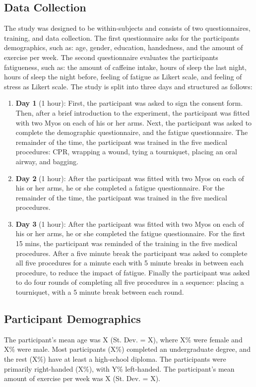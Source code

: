\subsection{Data Collection}
\label{sec:Experimental-Design:Data-Collection}
The study was designed to be within-subjects and consists of two questionnaires, training, and data collection. The first questionnaire asks for the participants demographics, such as: age, gender, education, handedness, and the amount of exercise per week. The second questionnaire evaluates the participants fatigueness, such as: the amount of caffeine intake, hours of sleep the last night, hours of sleep the night before, feeling of fatigue as Likert scale, and feeling of stress as Likert scale. The study is split into three days and structured as follows:
\begin{enumerate}
	\item \textbf{Day 1} (1 hour): First, the participant was asked to sign the consent form. Then, after a brief introduction to the experiment, the participant was fitted with two Myos on each of his or her arms. Next, the participant was asked to complete the demographic questionnaire, and the fatigue questionnaire. The remainder of the time, the participant was trained in the five medical procedures: CPR, wrapping a wound, tying a tourniquet, placing an oral airway, and bagging.
	\item \textbf{Day 2} (1 hour): After the participant was fitted with two Myos on each of his or her arms, he or she completed a fatigue questionnaire. For the remainder of the time, the participant was trained in the five medical procedures.
	\item \textbf{Day 3} (1 hour): After the participant was fitted with two Myos on each of his or her arms, he or she completed the fatigue questionnaire. For the first 15 mins, the participant was reminded of the training in the five medical procedures.
	After a five minute break the participant was asked to complete all five procedures for a minute each with 5 minute breaks in between each procedure, to reduce the impact of fatigue. Finally the participant was asked to do four rounds of completing all five procedures in a sequence: placing a tourniquet,  with a 5 minute break between each round.
\end{enumerate}

\subsection{Participant Demographics}
\label{sec:Data-Collection:Participant-Demographics}
The participant’s mean age was X (St. Dev. = X), where X\% were female and X\% were male. Most participants (X\%) completed an undergraduate degree, and the rest (X\%) have at least a high-school diploma. The participants were primarily right-handed (X\%), with Y\% left-handed. The participant's mean amount of exercise per week was X (St. Dev. = X).

